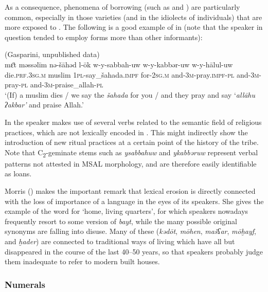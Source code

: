 \documentclass[output=paper]{langsci/langscibook}
\begin{document}
As a consequence, phenomena of borrowing (such as  and ) are particularly common, especially in those varieties (and in the idiolects of individuals) that are more exposed to . The following is a good example of  in  (note that the speaker in question tended to employ  forms more than other informants):

\ea\label{ex:key:allah}
{ (Gasparini, unpublished data)}\\
\gll mɛ̄t məssəlīm nə-šāhəd l-ōk w-y-sabbah-uw w-y-kabbər-uw w-y-hālul-uw\\
     die.\textsc{prf.3sg.m} muslim \textsc{1pl-}say\_šahada.\textsc{impf} for-\textsc{2sg.m} and-\textsc{3m-}pray.\textsc{impf-pl} and-3\textsc{m}-pray-\textsc{pl} and-\textsc{3m-}praise\_allah-\textsc{pl}\\
\glt `(If) a muslim dies / we say the \textit{šahada} for you / and they pray and say ‘\textit{allāhu} \textit{ʔakbar’} and praise Allah.'
\z

In  the speaker makes use of several  verbs related to the semantic field of religious practices, which are not lexically encoded in . This might indirectly show the introduction of new ritual practices at a certain point of the history of the tribe. Note that C\textsubscript{2}-geminate stems such as \textit{ysabbahuw} and \mbox{\textit{ykabbəruw}} represent verbal patterns not attested in MSAL morphology, and are therefore easily identifiable as loans.

Morris (\citeyear[15]{Morris2017}) makes the important remark that lexical erosion is directly connected with the loss of importance of a language in the eyes of its speakers. She gives the example of the  word for ‘home, living quarters’, for which speakers nowadays frequently resort to some version of  \textit{bayt}, while the many possible original synonyms are falling into disuse. Many of these (\textit{kədōt}, \textit{mōhen}, \textit{mašʕar}, \textit{mōḫayf}, and \textit{ḫader}) are connected to traditional ways of living which have all but disappeared in the course of the last 40--50 years, so that speakers probably judge them inadequate to refer to modern built houses. 


 \subsubsection{Numerals}
\end{document}
